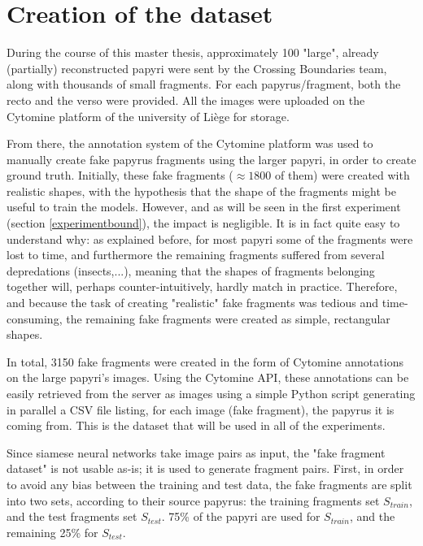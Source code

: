 \documentclass[11pt]{report}
\newcommand\xfrag{3150 }
\begin{document}
\section{Creation of the dataset}
\label{sec:data}

During the course of this master thesis, approximately 100 "large", already (partially) reconstructed papyri were sent by the Crossing Boundaries team, along with thousands of small fragments. For each papyrus/fragment, both the recto and the verso were provided. All the images were uploaded on the Cytomine platform of the university of Liège for storage.\newline

From there, the annotation system of the Cytomine platform was used to manually create fake papyrus fragments using the larger papyri, in order to create ground truth.\newline
Initially, these fake fragments ($\approx 1800$ of them) were created with realistic shapes, with the hypothesis that the shape of the fragments might be useful to train the models. However, and as will be seen in the first experiment (section \ref{experimentbound}), the impact is negligible. It is in fact quite easy to understand why: as explained before, for most papyri some of the fragments were lost to time, and furthermore the remaining fragments suffered from several depredations (insects,...), meaning that the shapes of fragments belonging together will, perhaps counter-intuitively, hardly match in practice.\newline
Therefore, and because the task of creating "realistic" fake fragments was tedious and time-consuming, the remaining fake fragments were created as simple, rectangular shapes.\newline

In total, \xfrag fake fragments were created in the form of Cytomine annotations on the large papyri's images. Using the Cytomine API, these annotations can be easily retrieved from the server as images using a simple Python script generating in parallel a CSV file listing, for each image (fake fragment), the papyrus it is coming from. This is the dataset that will be used in all of the experiments.\newline

Since siamese neural networks take image pairs as input, the "fake fragment dataset" is not usable as-is; it is used to generate fragment pairs.\newline
First, in order to avoid any bias between the training and test data, the fake fragments are split into two sets, according to their source papyrus: the training fragments set $S_{train}$, and the test fragments set $S_{test}$. 75\% of the papyri are used for $S_{train}$, and the remaining 25\% for $S_{test}$.\newline
\end{document}
